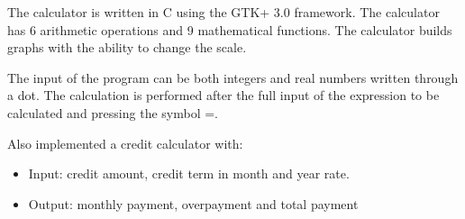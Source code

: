 \documentclass{article}
\def\header#1#2{\par\vspace{11pt}{\ifcase#1\or\huge\or\Large\or\large\or\normalsize\or\small\fi \bfseries #2}\vspace{11pt}\par}
\begin{document}
\header2{Documentation for SmartCalc-v1.0}

The calculator is written in C using the GTK+ 3.0 framework.
The calculator has 6 arithmetic operations and 9 mathematical functions.
The calculator builds graphs with the ability to change the scale.

The input of the program can be both integers and real numbers written through a dot.
The calculation is performed after the full input of the expression to be calculated and pressing the symbol =.

Also implemented a credit calculator with:
\begin{itemize}
\item Input: credit amount, credit term in month and year rate.
\item Output: monthly payment, overpayment and total payment
\end{itemize}
\end{document}
